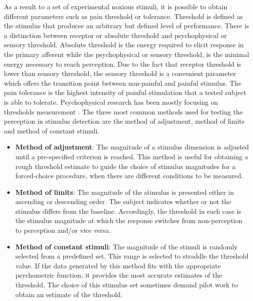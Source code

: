 As a result to a set of experimental noxious stimuli, it is possible to obtain different parameters such as pain threshold or tolerance. Threshold is defined as the stimulus that produces an arbitrary but defined level of performance. There is a distinction between receptor or absolute threshold and psychophysical or sensory threshold. Absolute threshold is the energy required to elicit response in the primary afferent while the psychophysical or sensory threshold, is the minimal energy necessary to reach perception. Due to the fact that receptor threshold is lower than sensory threshold, the sensory threshold is a convenient parameter which offers the transition point between non-painful and painful stimulus. \cite{Yarnitsky2006} The pain tolerance is the highest intensity of painful stimulation that a tested subject is able to tolerate. 
Psychophysical research has been mostly focusing on thresholds measurement \cite{Pelli2010}. The three most common methods used for testing the perception in stimulus detection are the method of adjustment, method of limits and method of constant stimuli.


\begin{itemize}
	\item \textbf{Method of adjustment}: The magnitude of a stimulus dimension is adjusted until a pre-specified criterion is reached. This method is useful for obtaining a rough threshold estimate to guide the choice of stimulus magnitudes for a forced-choice procedure, when there are different conditions to be measured. \cite{Kingdom2016}
	\item \textbf{Method of limits}: The magnitude of the stimulus is presented either in ascending or descending order.
	The subject indicates whether or not the stimulus differs from the baseline. Accordingly, the threshold in each case is the stimulus magnitude at which the response switches from non-perception to perception and/or vice versa. \cite{Kingdom2016}
	\item \textbf{Method of constant stimuli}: The magnitude of the stimuli is randomly selected from a predefined set. This range is selected to straddle the threshold value. If the data generated by this method fits with the appropriate psychometric function, it provides the most accurate estimates of the threshold. The choice of this stimulus set sometimes demand pilot work to obtain an estimate of the threshold. \cite{Kingdom2016}
\end{itemize}
